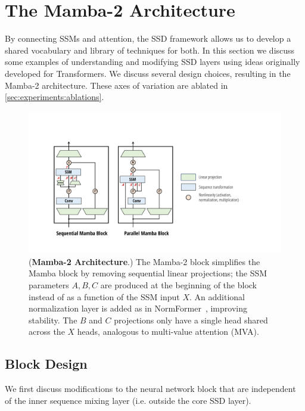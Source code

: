 \section{The Mamba-2 Architecture}
\label{sec:architecture}

By connecting SSMs and attention, the SSD framework allows us to develop a shared vocabulary and library of techniques for both.
In this section we discuss some examples of understanding and modifying SSD layers using ideas originally developed for Transformers.
We discuss several design choices, resulting in the Mamba-2 architecture.
These axes of variation are ablated in \cref{sec:experiments:ablations}.


\begin{figure}[!t]
  \centering
  \includegraphics[width=\iftoggle{arxiv}{0.8\linewidth}{\linewidth}]{fig/architecture_2.pdf}
  \caption{
    (\textbf{Mamba-2 Architecture}.) The Mamba-2 block simplifies the Mamba block by removing sequential linear projections; the SSM parameters $A, B, C$ are produced at the beginning of the block instead of as a function of the SSM input $X$.
    An additional normalization layer is added as in NormFormer~\citep{shleifer2021normformer}, improving stability.
    The $B$ and $C$ projections only have a single head shared across the $X$ heads, analogous to multi-value attention (MVA).
  }
  \label{fig:architecture}
  \iftoggle{arxiv}{}{\vspace{-1.25em}}
\end{figure}

\subsection{Block Design}
\label{sec:architecture:block}


We first discuss modifications to the neural network block that are independent of the inner sequence mixing layer (i.e. outside the core SSD layer).

